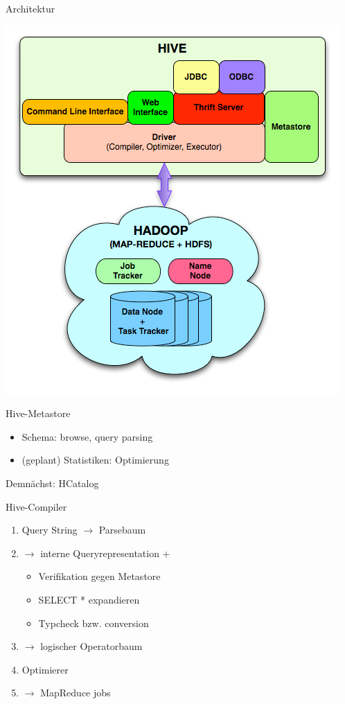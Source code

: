 \documentclass{beamer}
\begin{document}
\begin{frame}{Architektur}
  \begin{center}
    \includegraphics[height=\textheight]{../ausarbeitung/images/hive-architecture.png}    
  \end{center}
\end{frame}

\begin{frame}{Hive-Metastore}
  \begin{itemize}
  \item Schema: browse, query parsing
  \item (geplant) Statistiken: Optimierung
  \end{itemize}
  Demnächst: HCatalog
\end{frame}

\begin{frame}{Hive-Compiler}
  \begin{enumerate}
\item Query String $\rightarrow$ Parsebaum
\item $\rightarrow$ interne Queryrepresentation +
  \begin{itemize}
  \item Verifikation gegen Metastore
  \item SELECT * expandieren
  \item Typcheck bzw. conversion
  \end{itemize}
\item $\rightarrow$ logischer Operatorbaum
\item Optimierer
\item $\rightarrow$ MapReduce jobs
\end{enumerate}
  
\end{frame}
\end{document}
